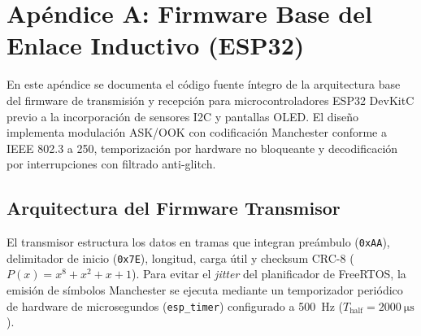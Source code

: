 \section{Apéndice A: Firmware Base del Enlace Inductivo (ESP32)}
\label{sec:apendice_firmware}

En este apéndice se documenta el código fuente íntegro de la arquitectura base del firmware de transmisión y recepción para microcontroladores ESP32 DevKitC previo a la incorporación de sensores I2C y pantallas OLED. El diseño implementa modulación ASK/OOK con codificación Manchester conforme a IEEE 802.3 a \SI{250}{}, temporización por hardware no bloqueante y decodificación por interrupciones con filtrado anti-glitch.

\subsection{Arquitectura del Firmware Transmisor}

El transmisor estructura los datos en tramas que integran preámbulo (\texttt{0xAA}), delimitador de inicio (\texttt{0x7E}), longitud, carga útil y checksum CRC-8 ($P(x) = x^8 + x^2 + x + 1$). Para evitar el \textit{jitter} del planificador de FreeRTOS, la emisión de símbolos Manchester se ejecuta mediante un temporizador periódico de hardware de microsegundos (\texttt{esp\_timer}) configurado a \SI{500}{\hertz} ($T_{\text{half}} = \SI{2000}{\micro\second}$).

